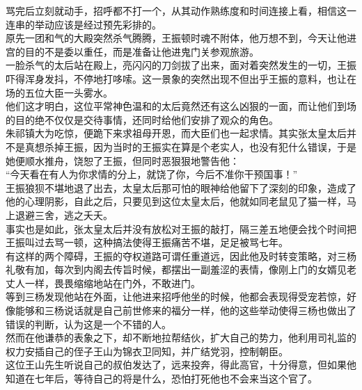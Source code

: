 \begin{multicols}{\theparacolNo}
骂完后立刻就动手，招呼都不打一个，从其动作熟练度和时间连接上看，相信这一连串的举动应该是经过预先彩排的。\\

原先一团和气的大殿突然杀气腾腾，王振顿时魂不附体，他万想不到，今天让他进宫的目的不是委以重任，而是准备让他进鬼门关参观旅游。\\

一脸杀气的太后站在殿上，亮闪闪的刀剑拔了出来，面对着突然发生的一切，王振吓得浑身发抖，不停地打哆嗦。这一景象的突然出现不但出乎王振的意料，也让在场的五位大臣一头雾水。\\

他们这才明白，这位平常神色温和的太后竟然还有这么凶狠的一面，而让他们到场的目的绝不仅仅是交待事情，还同时给他们安排了观众的角色。\\

朱祁镇大为吃惊，便跪下来求祖母开恩，而大臣们也一起求情。其实张太皇太后并不是真想杀掉王振，因为当时的王振实在算是个老实人，也没有犯什么错误，于是她便顺水推舟，饶恕了王振，但同时恶狠狠地警告他：\\

“今天看在有人为你求情的分上，就饶了你，今后不准你干预国事！”\\

王振狼狈不堪地退了出去，太皇太后那可怕的眼神给他留下了深刻的印象，造成了他的心理阴影，自此之后，只要见到这位太皇太后，他就如同老鼠见了猫一样，马上退避三舍，逃之夭夭。\\

事实也是如此，张太皇太后并没有放松对王振的敲打，隔三差五地便会找个时间把王振叫过去骂一顿，这种搞法使得王振痛苦不堪，足足被骂七年。\\

有这样的两个障碍，王振的夺权道路可谓任重道远，因此他及时转变策略，对三杨礼敬有加，每次到内阁去传旨时候，都摆出一副羞涩的表情，像刚上门的女婿见老丈人一样，畏畏缩缩地站在门外，不敢进门。\\

等到三杨发现他站在外面，让他进来招呼他坐的时候，他都会表现得受宠若惊，好像能够和三杨说话就是自己前世修来的福分一样，他的这些举动使得三杨也做出了错误的判断，认为这是一个不错的人。\\

然而在他谦恭的表象之下，却不断地拉帮结伙，扩大自己的势力，他利用司礼监的权力安插自己的侄子王山为锦衣卫同知，并广结党羽，控制朝臣。\\

这位王山先生听说自己的叔伯发达了，远来投奔，得此高官，十分得意，但如果他知道在七年后，等待自己的将是什么，恐怕打死他也不会来当这个官了。\\


\end{multicols}

